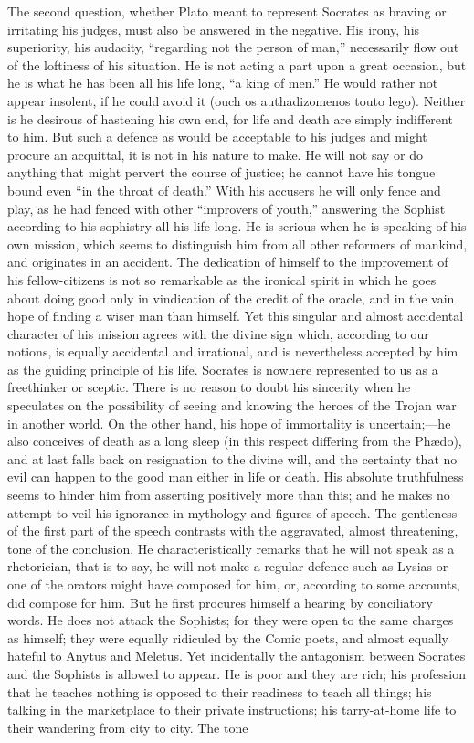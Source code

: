 \documentclass[11pt,letter]{article}
\begin{document}
\par  The second question, whether Plato meant to represent Socrates as braving or irritating his judges, must also be answered in the negative. His irony, his superiority, his audacity, “regarding not the person of man,” necessarily flow out of the loftiness of his situation. He is not acting a part upon a great occasion, but he is what he has been all his life long, “a king of men.” He would rather not appear insolent, if he could avoid it (ouch os authadizomenos touto lego). Neither is he desirous of hastening his own end, for life and death are simply indifferent to him. But such a defence as would be acceptable to his judges and might procure an acquittal, it is not in his nature to make. He will not say or do anything that might pervert the course of justice; he cannot have his tongue bound even “in the throat of death.” With his accusers he will only fence and play, as he had fenced with other “improvers of youth,” answering the Sophist according to his sophistry all his life long. He is serious when he is speaking of his own mission, which seems to distinguish him from all other reformers of mankind, and originates in an accident. The dedication of himself to the improvement of his fellow-citizens is not so remarkable as the ironical spirit in which he goes about doing good only in vindication of the credit of the oracle, and in the vain hope of finding a wiser man than himself. Yet this singular and almost accidental character of his mission agrees with the divine sign which, according to our notions, is equally accidental and irrational, and is nevertheless accepted by him as the guiding principle of his life. Socrates is nowhere represented to us as a freethinker or sceptic. There is no reason to doubt his sincerity when he speculates on the possibility of seeing and knowing the heroes of the Trojan war in another world. On the other hand, his hope of immortality is uncertain;—he also conceives of death as a long sleep (in this respect differing from the Phædo), and at last falls back on resignation to the divine will, and the certainty that no evil can happen to the good man either in life or death. His absolute truthfulness seems to hinder him from asserting positively more than this; and he makes no attempt to veil his ignorance in mythology and figures of speech. The gentleness of the first part of the speech contrasts with the aggravated, almost threatening, tone of the conclusion. He characteristically remarks that he will not speak as a rhetorician, that is to say, he will not make a regular defence such as Lysias or one of the orators might have composed for him, or, according to some accounts, did compose for him. But he first procures himself a hearing by conciliatory words. He does not attack the Sophists; for they were open to the same charges as himself; they were equally ridiculed by the Comic poets, and almost equally hateful to Anytus and Meletus. Yet incidentally the antagonism between Socrates and the Sophists is allowed to appear. He is poor and they are rich; his profession that he teaches nothing is opposed to their readiness to teach all things; his talking in the marketplace to their private instructions; his tarry-at-home life to their wandering from city to city. The tone 
\end{document}
